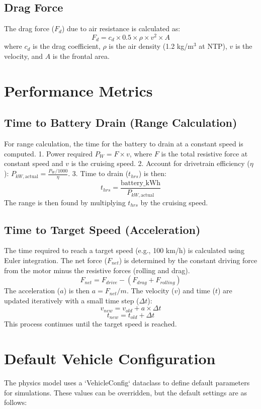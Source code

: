 \documentclass{article}
\begin{document}
\subsection{Drag Force}
The drag force ($F_d$) due to air resistance is calculated as:
$$F_d = c_d \times 0.5 \times \rho \times v^2 \times A$$
where $c_d$ is the drag coefficient, $\rho$ is the air density (1.2 kg/m$^3$ at NTP), $v$ is the velocity, and $A$ is the frontal area.

\section{Performance Metrics}

\subsection{Time to Battery Drain (Range Calculation)}
For range calculation, the time for the battery to drain at a constant speed is computed.
1. Power required $P_W = F \times v$, where $F$ is the total resistive force at constant speed and $v$ is the cruising speed.
2. Account for drivetrain efficiency ($\eta$): $P_{kW, \text{actual}} = \frac{P_W / 1000}{\eta}$.
3. Time to drain ($t_{hrs}$) is then:
$$t_{hrs} = \frac{\text{battery\_kWh}}{P_{kW, \text{actual}}}$$
The range is then found by multiplying $t_{hrs}$ by the cruising speed.

\subsection*{Time to Target Speed (Acceleration)}
The time required to reach a target speed (e.g., 100 km/h) is calculated using Euler integration. The net force ($F_{net}$) is determined by the constant driving force from the motor minus the resistive forces (rolling and drag).
$$F_{net} = F_{drive} - (F_{drag} + F_{rolling})$$
The acceleration ($a$) is then $a = F_{net} / m$.
The velocity ($v$) and time ($t$) are updated iteratively with a small time step ($\Delta t$):
$$v_{new} = v_{old} + a \times \Delta t$$
$$t_{new} = t_{old} + \Delta t$$
This process continues until the target speed is reached.

\section{Default Vehicle Configuration}

The physics model uses a `VehicleConfig` dataclass to define default parameters for simulations. These values can be overridden, but the default settings are as follows:
\end{document}
